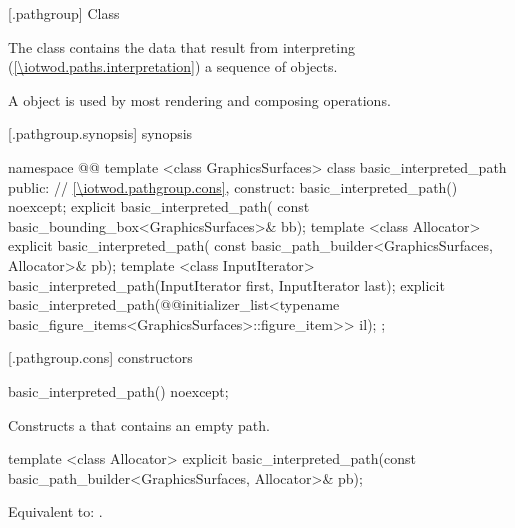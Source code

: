  [\iotwod.pathgroup] {Class }

\pnum
{}%
The class  contains the data that result from interpreting (\ref{\iotwod.paths.interpretation}) a sequence of  objects.

\pnum
A  object is used by most rendering and composing operations.

 [\iotwod.pathgroup.synopsis] { synopsis}

\begin{codeblock}
namespace @\fullnamespace{}@ {
  template <class GraphicsSurfaces>
  class basic_interpreted_path {
  public:
    // \ref{\iotwod.pathgroup.cons}, construct:
    basic_interpreted_path() noexcept;
    explicit basic_interpreted_path(
      const basic_bounding_box<GraphicsSurfaces>& bb);
    template <class Allocator>
    explicit basic_interpreted_path(
      const basic_path_builder<GraphicsSurfaces, Allocator>& pb);
    template <class InputIterator>
    basic_interpreted_path(InputIterator first, InputIterator last);
    explicit basic_interpreted_path(@\stdqualifier{}@initializer_list<typename
      basic_figure_items<GraphicsSurfaces>::figure_item>> il);
  };
}
\end{codeblock}

 [\iotwod.pathgroup.cons] { constructors}

%
\begin{itemdecl}
basic_interpreted_path() noexcept;
\end{itemdecl}
\begin{itemdescr}
\pnum
\effects
Constructs a  that contains an empty path.
\end{itemdescr}

%
\begin{itemdecl}
template <class Allocator>
explicit basic_interpreted_path(const basic_path_builder<GraphicsSurfaces, Allocator>& pb);
\end{itemdecl}
\begin{itemdescr}
\pnum
\effects
Equivalent to: .	
\end{itemdescr}


